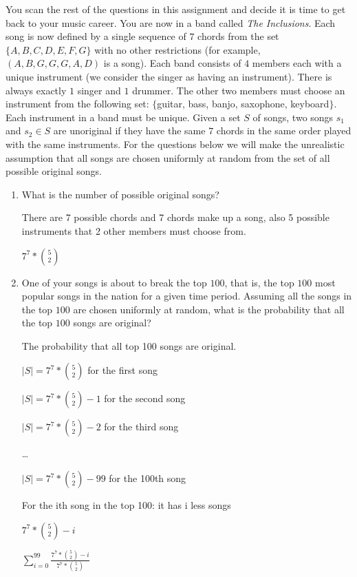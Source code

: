 \documentclass[12pt]{article}
\newcounter{ques}
\newenvironment{question}{\stepcounter{ques}{\noindent\bf Question \arabic{ques}:}}{\vspace{5mm}}
\begin{document}
\begin{question}
	You scan the rest of the questions in this assignment and decide it is time to get back to your music career. You are now in a band called \emph{The Inclusions}. Each song is now defined by a single sequence of $7$ chords from the set $\{A,B,C,D,E,F,G\}$ with no other restrictions (for example, $(A,B,G,G,G,A,D)$ is a song). Each band consists of $4$ members each with a unique instrument (we consider the singer as having an instrument). There is always exactly $1$ singer and $1$ drummer. The other two members must choose an instrument from the following set: $\{$guitar, bass, banjo, saxophone, keyboard$\}$. Each instrument in a band must be unique. Given a set $S$ of songs, two songs $s_1$ and $s_2 \in S$ are unoriginal if they have the same $7$ chords in the same order played with the same instruments. For the questions below we will make the unrealistic assumption that all songs are chosen uniformly at random from the set of all possible original songs.
	\begin{enumerate}
		\item What is the number of possible original songs?
		
		There are 7 possible chords and 7 chords make up a song, also 5 possible instruments that 2 other members must choose from.

		$7^7 * {5 \choose 2}$
		
		\item One of your songs is about to break the top $100$, that is, the top $100$ most popular songs in the nation for a given time period. Assuming all the songs in the top $100$ are chosen uniformly at random, what is the probability that all the top $100$ songs are original?
		
		The probability that all top 100 songs are original.

		$|S| = 7^7 * {5 \choose 2}$ for the first song

		$|S| = 7^7 * {5 \choose 2} - 1$ for the second song

		$|S| = 7^7 * {5 \choose 2} - 2$ for the third song

		\dots

		$|S| = 7^7 * {5 \choose 2} - 99$ for the 100th song

		For the ith song in the top 100: it has i less songs

		$7^7 * {5 \choose 2} - i$

		$\sum_{i=0}^{99} \frac{7^7 * {5 \choose 2} - i}{7^7 * {5 \choose 2}}$


\end{enumerate}
\end{question}
\end{document}
